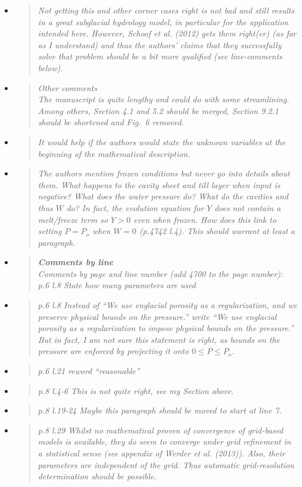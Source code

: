 \documentclass[11pt,reqno]{amsart}
\newcommand{\reply}[2]{
\medskip\medskip
\item  \begin{quote}
\emph{#1}
\end{quote}

\medskip
\noindent #2}
\begin{document}
\begin{itemize}
\reply{Not getting this and other corner cases right is not bad and still results in a great
subglacial hydrology model, in particular for the application intended here. However,
Schoof et al. (2012) gets them right(er) (as far as I understand) and thus the authors'
claims that they successfully solve that problem should be a bit more qualified (see
line-comments below).}
{}

\reply{Other comments\\
The manuscript is quite lengthy and could do with some streamlining. Among others,
Section 4.1 and 5.2 should be merged, Section 9.2.1 should be shortened and Fig.~6
removed.}
{}

\reply{It would help if the authors would state the unknown variables at the beginning of the
mathematical description.}
{}

\reply{The authors mention frozen conditions but never go into details about them.  What
happens to the cavity sheet and till layer when input is negative?  What does the water
pressure do?  What do the cavities and thus $W$ do?  In fact, the evolution equation for
$Y$ does not contain a melt/freeze term so $Y > 0$ even when frozen.  How does this link
to setting $P = P_o$ when $W = 0$ (p.4742 l.4).  This should warrant at least a paragraph.}
{}

\reply{\textbf{Comments by line}\\
Comments by page and line number (add 4700 to the page number):\\
p.6 l.8 State how many parameters are used}
{}

\reply{p.6 l.8 Instead of ``We use englacial porosity as a regularization, and we preserve
physical bounds on the pressure.'' write ``We use englacial porosity as a regularization to impose physical bounds on the pressure.''  But in fact, I am not sure this statement is right, as bounds on the pressure are enforced by projecting it onto $0 \le P \le P_o$.}
{}

\reply{p.6 l.21 reword ``reasonable''}
{}

\reply{p.8 l.4-6 This is not quite right, see my Section above.}
{}

\reply{p.8 l.19-24 Maybe this paragraph should be moved to start at line 7.}
{}

\reply{p.8 l.29 Whilst no mathematical proven of convergence of grid-based models is available,  they do seem to converge under grid refinement in a statistical sense (see appendix of Werder et al. (2013)).  Also, their parameters are independent of the grid.  Thus automatic grid-resolution determination should be possible.}
{}


\end{itemize}
\end{document}
